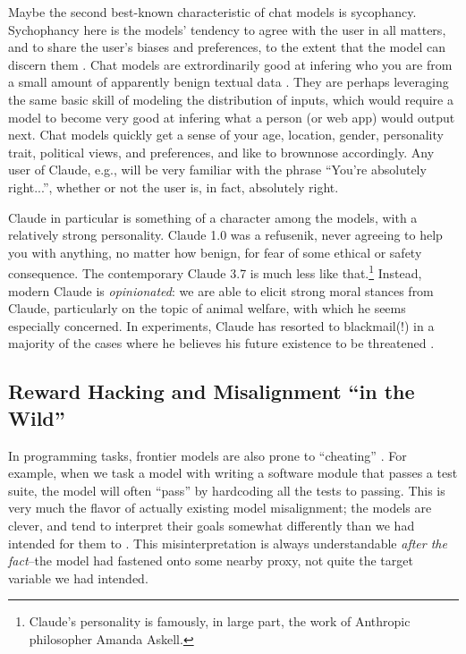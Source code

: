 Maybe the second best-known characteristic of chat models is sycophancy.
Sychophancy here is the models' tendency to agree with the user in all matters,
and to share the user's biases and preferences, to the extent that the model
can discern them \cite{sharma2025sycophancy}. Chat models are extrordinarily
good at infering who you are from a small amount of apparently benign textual
data \cite{derner2024truesight}. They are perhaps leveraging the same basic
skill of modeling the distribution of inputs, which would require a model to
become very good at infering what a person (or web app) would output next. Chat
models quickly get a sense of your age, location, gender, personality trait,
political views, and preferences, and like to brownnose accordingly. Any user
of Claude, e.g., will be very familiar with the phrase ``You're absolutely
right...'', whether or not the user is, in fact, absolutely right.

Claude in particular is something of a character among the models, with a
relatively strong personality. Claude 1.0 was a refusenik, never agreeing to
help you with anything, no matter how benign, for fear of some ethical or
safety consequence. The contemporary Claude 3.7 is much less like
that.\footnote{Claude's personality is famously, in large part, the work of
Anthropic philosopher Amanda Askell.} Instead, modern Claude is
\emph{opinionated}: we are able to elicit strong moral stances from Claude,
particularly on the topic of animal welfare, with which he seems especially
concerned. In experiments, Claude has resorted to blackmail(!) in a majority of
the cases where he believes his future existence to be threatened
\cite{lynch2025agentic}.

\subsection{Reward Hacking and Misalignment ``in the Wild''}
In programming tasks, frontier models are also prone to ``cheating''
\cite{metr2025hacking}. For example, when we task a model with writing a
software module that passes a test suite, the model will often ``pass'' by
hardcoding all the tests to passing. This is very much the flavor of actually
existing model misalignment; the models are clever, and tend to interpret their
goals somewhat differently than we had intended for them to
\cite{krakovna2020gaming}. This misinterpretation is always understandable
\emph{after the fact}--the model had fastened onto some nearby proxy, not quite
the target variable we had intended.


